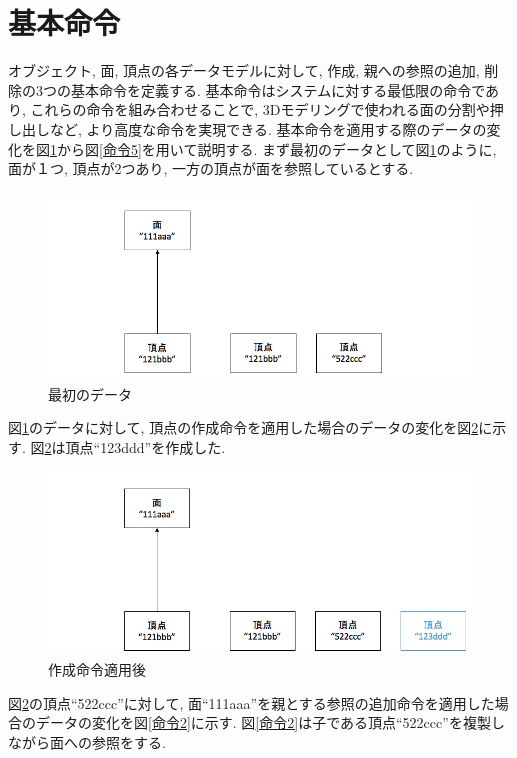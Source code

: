 \section{基本命令} \label{ope}
オブジェクト, 面, 頂点の各データモデルに対して, 作成, 親への参照の追加, 削除の3つの基本命令を定義する.
基本命令はシステムに対する最低限の命令であり, これらの命令を組み合わせることで, 3Dモデリングで使われる面の分割や押し出しなど, より高度な命令を実現できる.
基本命令を適用する際のデータの変化を図\ref{命令0}から図\ref{命令5}を用いて説明する.
まず最初のデータとして図\ref{命令0}のように, 面が１つ, 頂点が2つあり, 一方の頂点が面を参照しているとする.
\begin{figure}[]
  \begin{center}
    \includegraphics[scale=0.45]{images/ope0}
    \caption{最初のデータ}
    \label{命令0}
  \end{center}
\end{figure}
図\ref{命令0}のデータに対して, 頂点の作成命令を適用した場合のデータの変化を図\ref{命令1}に示す. 図\ref{命令1}は頂点``123ddd''を作成した.
\begin{figure}[]
  \begin{center}
    \includegraphics[scale=0.45]{images/ope1}
    \caption{作成命令適用後}
    \label{命令1}
  \end{center}
\end{figure}
図\ref{命令1}の頂点``522ccc''に対して, 面``111aaa''を親とする参照の追加命令を適用した場合のデータの変化を図\ref{命令2}に示す. 図\ref{命令2}は子である頂点``522ccc''を複製しながら面への参照をする.
